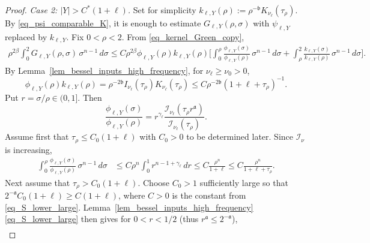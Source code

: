 \documentclass[10pt,a4paper]{amsart}
\begin{document}
\begin{proof}
\textit{Case 2: $|Y|> C^*(1+\ell)$.} Set for simplicity $k_{\ell,Y}(\rho):=\rho^{-\mathfrak b}K_{\nu_\ell}(\tau_\rho)$. 
By \eqref{eq_psi_comparable_K}, it is enough to estimate $G_{\ell,Y}(\rho,\sigma)$ with $\psi_{\ell,Y}$ replaced by $k_{\ell,Y}$. Fix $0<\rho<2$. From \eqref{eq_kernel_Green_copy},
\begin{align}\label{eq_weighted_split}
    \rho^{2\beta}
    \int_0^2
        G_{\ell,Y}(\rho,\sigma)
    \, \sigma^{n-1} \, d\sigma                                      \nonumber
    \le
    C\rho^{2\beta}
    \phi_{\ell,Y}(\rho)k_{\ell,Y}(\rho)
    \biggl[\int_0^\rho \frac{\phi_{\ell,Y}(\sigma)}{\phi_{\ell,Y}(\rho)} \, \sigma^{n-1} \, d\sigma + \int_\rho^2 \frac{k_{\ell,Y}(\sigma)}{k_{\ell,Y}(\rho)} \, \sigma^{n-1} \, d\sigma \biggr].
\end{align}
By Lemma~\ref{lem_bessel_inputs_high_frequency}, for $\nu_\ell\ge \nu_0>0$,
\begin{equation}\label{eq_phi_k_product}
    \phi_{\ell,Y}(\rho)k_{\ell,Y}(\rho)
    =
    \rho^{-2\mathfrak b}
    I_{\nu_\ell}(\tau_\rho)K_{\nu_\ell}(\tau_\rho)
    \le
    C\rho^{-2\mathfrak b}(1 + \ell + \tau_\rho)^{-1}.
\end{equation}
Put $r=\sigma/\rho\in(0,1]$. Then
\begin{equation*}
\frac{\phi_{\ell,Y}(\sigma)}{\phi_{\ell,Y}(\rho)} = r^{\gamma_\ell} \frac{\mathcal I_{\nu_\ell}(\tau_\rho r^{\mathfrak a})}{\mathcal I_{\nu_\ell}(\tau_\rho)}.
\end{equation*}
Assume first that $\tau_\rho \le  C_0(1+\ell)$ with $C_0>0$ to be determined later. Since $\mathcal I_\nu$ is increasing,
\begin{align*}
    \int_0^\rho
        \frac{\phi_{\ell,Y}(\sigma)}
             {\phi_{\ell,Y}(\rho)}
    \, \sigma^{n-1} \, d\sigma
    &\le C\rho^n \int_0^1 r^{n-1+\gamma_\ell}\,dr
    \le C\frac{\rho^n}{1+\ell}
    \le C\frac{\rho^n}{1+ \ell + \tau_\rho}.
\end{align*}
Next assume that $\tau_\rho>C_0(1+\ell)$. Choose $C_0>1$ sufficiently large so that $2^{- \mathfrak a} C_0 (1+\ell) \ge C(1+\ell)$, where $C>0$ is the constant from \eqref{eq_S_lower_large}. Lemma~\ref{lem_bessel_inputs_high_frequency} \eqref{eq_S_lower_large} then gives for $0<r<1/2$ (thus $r^{\mathfrak a}\le 2^{- \mathfrak a}$),
\begin{align*}

\end{align*}
\end{proof}
\end{document}
